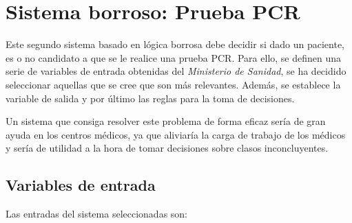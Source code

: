 \documentclass[12pt,a4paper, xcolor=table]{article}
\begin{document}
\section{Sistema borroso: Prueba PCR}

Este segundo sistema basado en lógica borrosa debe decidir si dado un paciente, es o no candidato a que se le realice una prueba PCR. Para ello, se definen una serie de variables de entrada obtenidas del \textit{Ministerio de Sanidad}\cite{paciente}, se ha decidido seleccionar aquellas que se cree que son más relevantes. Además, se establece la variable de salida y por último las reglas para la toma de decisiones.

\vspace{2mm}

Un sistema que consiga resolver este problema de forma eficaz sería de gran ayuda en los centros médicos, ya que aliviaría la carga de trabajo de los médicos y sería de utilidad a la hora de tomar decisiones sobre clasos inconcluyentes.


\subsection{Variables de entrada}

Las entradas del sistema seleccionadas son:
\end{document}
